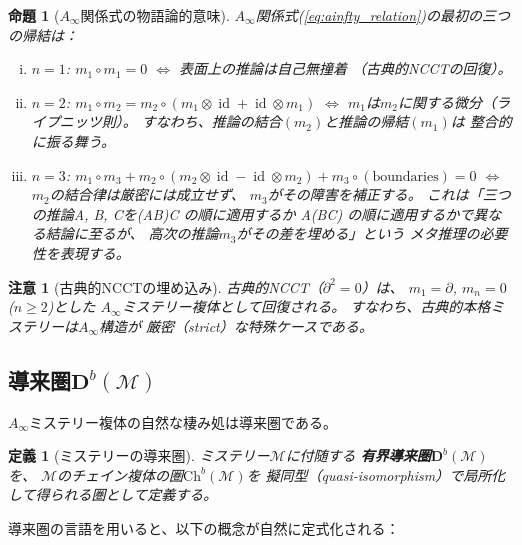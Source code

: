 \documentclass[12pt,twocolumn]{ltjsarticle}
\newtheorem{proposition}[theorem]{命題}
\newtheorem{definition}[theorem]{定義}
\newtheorem{remark}[theorem]{注意}
\newcommand{\id}{\operatorname{id}}
\newcommand{\Mys}{\mathcal{M}}
\newcommand{\Db}{\mathbf{D}^b}
\begin{document}
\begin{proposition}[$A_\infty$関係式の物語論的意味]
\label{prop:ainfty_meaning}
$A_\infty$関係式(\ref{eq:ainfty_relation})の最初の三つの帰結は：
\begin{enumerate}[(i)]
\item $n = 1$: $m_1 \circ m_1 = 0$
\quad $\Leftrightarrow$
\quad \emph{表面上の推論は自己無撞着}
（古典的NCCTの回復）。

\item $n = 2$: $m_1 \circ m_2 = m_2 \circ (m_1 \otimes \id + \id \otimes m_1)$
\quad $\Leftrightarrow$
\quad \emph{$m_1$は$m_2$に関する微分（ライプニッツ則）。}
すなわち、推論の結合$(m_2)$と推論の帰結$(m_1)$は
整合的に振る舞う。

\item $n = 3$:
$m_1 \circ m_3 + m_2 \circ (m_2 \otimes \id - \id \otimes m_2)
+ m_3 \circ (\text{boundaries}) = 0$
\quad $\Leftrightarrow$
\quad \emph{$m_2$の結合律は厳密には成立せず、
$m_3$がその障害を補正する。}
これは「三つの推論A, B, Cを(AB)C の順に適用するか
A(BC) の順に適用するかで異なる結論に至るが、
高次の推論$m_3$がその差を埋める」という
メタ推理の必要性を表現する。
\end{enumerate}
\end{proposition}

\begin{remark}[古典的NCCTの埋め込み]
古典的NCCT（$\partial^2 = 0$）は、
$m_1 = \partial$, $m_n = 0$ ($n \geq 2$)とした
$A_\infty$ミステリー複体として回復される。
すなわち、古典的本格ミステリーは$A_\infty$構造が
厳密（strict）な特殊ケースである。
\end{remark}


\subsection{導来圏$\Db(\Mys)$}

$A_\infty$ミステリー複体の自然な棲み処は導来圏である。

\begin{definition}[ミステリーの導来圏]
\label{def:derived_category}
ミステリー$\Mys$に付随する
\textbf{有界導来圏}$\Db(\Mys)$を、
$\Mys$のチェイン複体の圏$\mathrm{Ch}^b(\Mys)$を
擬同型（quasi-isomorphism）で局所化して得られる圏として定義する。
\end{definition}

導来圏の言語を用いると、以下の概念が自然に定式化される：
\end{document}
